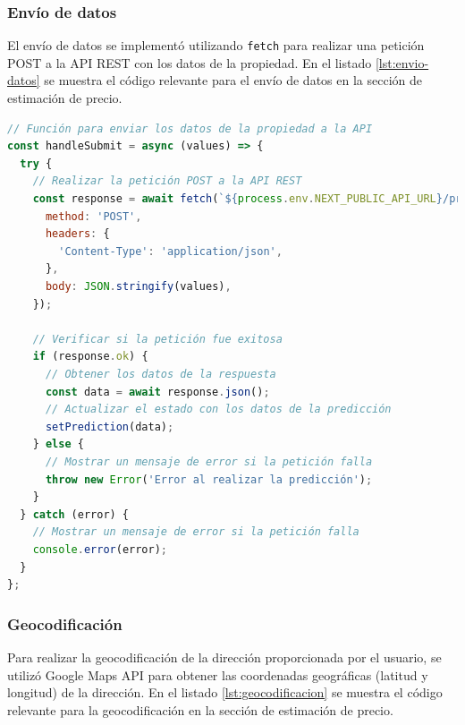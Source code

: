 \subsubsection{Envío de datos}
El envío de datos se implementó utilizando \texttt{fetch} para realizar una petición
POST a la API REST con los datos de la propiedad. En el listado \ref{lst:envio-datos}
se muestra el código relevante para el envío de datos en la sección de estimación de
precio.

\begin{lstlisting}[language=javascript, caption={Envío de datos}, label={lst:envio-datos}]
// Función para enviar los datos de la propiedad a la API
const handleSubmit = async (values) => {
  try {
    // Realizar la petición POST a la API REST
    const response = await fetch(`${process.env.NEXT_PUBLIC_API_URL}/predict`, {
      method: 'POST',
      headers: {
        'Content-Type': 'application/json',
      },
      body: JSON.stringify(values),
    });

    // Verificar si la petición fue exitosa
    if (response.ok) {
      // Obtener los datos de la respuesta
      const data = await response.json();
      // Actualizar el estado con los datos de la predicción
      setPrediction(data);
    } else {
      // Mostrar un mensaje de error si la petición falla
      throw new Error('Error al realizar la predicción');
    }
  } catch (error) {
    // Mostrar un mensaje de error si la petición falla
    console.error(error);
  }
};
\end{lstlisting}

\subsubsection{Geocodificación}
Para realizar la geocodificación de la dirección proporcionada por el usuario, se
utilizó Google Maps API para obtener las coordenadas geográficas (latitud y longitud)
de la dirección. En el listado \ref{lst:geocodificacion} se muestra el código relevante
para la geocodificación en la sección de estimación de precio.

